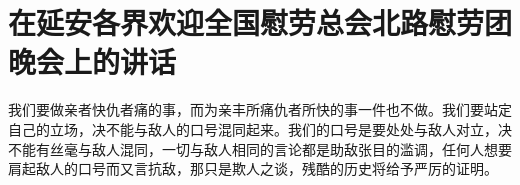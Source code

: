 \section[在延安各界欢迎全国慰劳总会北路慰劳团晚会上的讲话]{在延安各界欢迎全国慰劳总会北路慰劳团晚会上的讲话}


我们要做亲者快仇者痛的事，而为亲丰所痛仇者所快的事一件也不做。我们要站定自己的立场，决不能与敌人的口号混同起来。我们的口号是要处处与敌人对立，决不能有丝毫与敌人混同，一切与敌人相同的言论都是助敌张目的滥调，任何人想要肩起敌人的口号而又言抗敌，那只是欺人之谈，残酷的历史将给予严厉的证明。

